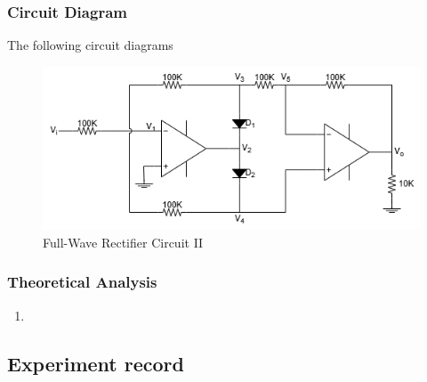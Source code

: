     \subsubsection{Circuit Diagram}
        The following circuit diagrams 
        \begin{figure}[H]
            \centering
                \includegraphics[width=0.7\linewidth]{Experiment_14/Circuit/Lab14.drawio.png}
                \caption{Full-Wave Rectifier Circuit II}
                \label{cir:14}
        \end{figure}

    \subsubsection{Theoretical Analysis}
        \begin{enumerate}[a]
            \item \textbf{}
        \end{enumerate}

\subsection{Experiment record}
